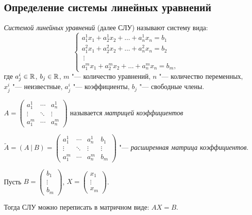 \subsection*{Определение системы линейных уравнений}
\begin{definition}
    \textit{Системой линейных уравнений} (далее СЛУ) называют систему вида:
    \begin{equation}
        \label{eq:SLU}
        \begin{cases}
        a_1^1x_1 +  a_2^1x_2 + \ldots + a_n^1x_n = b_1 \\
        a_1^2x_1 +  a_2^2x_2 + \ldots + a_n^2x_n = b_2 \\
        ~\vdots \\
        a_1^mx_1 +  a_2^mx_2 + \dots + a_n^mx_n = b_m,
    \end{cases}
    \end{equation} 
    где $a_j^i \in \mathbb{R}$, $b_j \in \mathbb{R}$, $m$ "--- количество уравнений, $n$ "--- количество переменных, $x_j^i$ "--- неизвестные, $a_j^i$ "--- коэффициенты, $b_j$ "--- свободные члены.
\end{definition}
$A = \begin{pmatrix}
    a_1^1 & \cdots & a_n^1 \\
    \vdots & \ddots & \vdots \\
    a_1^m & \cdots & a_n^m
\end{pmatrix}$ называется \textit{матрицей коэффициентов}

$\tilde{A} = (A~|~B) =
\left({ 
\begin{array}{ccc|c}
    a_1^1 & \cdots & a_n^1 & b_1 \\
    \vdots & \ddots & \vdots & \vdots \\
    a_1^m & \cdots & a_n^m & b_m
\end{array}} \right)$ "--- \textit{расширенная матрица коэффициентов}.

Пусть $B = \begin{pmatrix}
    b_1 \\
    \vdots \\
    b_m
\end{pmatrix}$, $X = \begin{pmatrix}
    x_1 \\
    \vdots \\
    x_m
\end{pmatrix}$. 

Тогда СЛУ можно переписать в матричном виде:
$ AX = B$.

\vspace{0.2cm}

